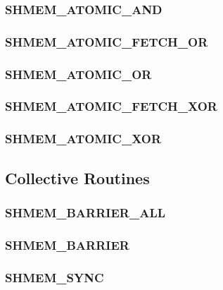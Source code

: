 \documentclass[10pt]{book}
\begin{document}
\subsubsection{\textbf{SHMEM\_ATOMIC\_AND}}
\label{subsec:shmem_atomic_and}


\subsubsection{\textbf{SHMEM\_ATOMIC\_FETCH\_OR}}
\label{subsec:shmem_atomic_fetch_or}


\subsubsection{\textbf{SHMEM\_ATOMIC\_OR}}
\label{subsec:shmem_atomic_or}


\subsubsection{\textbf{SHMEM\_ATOMIC\_FETCH\_XOR}}
\label{subsec:shmem_atomic_fetch_xor}


\subsubsection{\textbf{SHMEM\_ATOMIC\_XOR}}
\label{subsec:shmem_atomic_xor}


\subsection{Collective Routines}\label{subsec:coll}


\subsubsection{\textbf{SHMEM\_BARRIER\_ALL}}\label{subsec:shmem_barrier_all}


\subsubsection{\textbf{SHMEM\_BARRIER}}\label{subsec:shmem_barrier}


\subsubsection{\textbf{SHMEM\_SYNC}}\label{subsec:shmem_sync}

\end{document}
